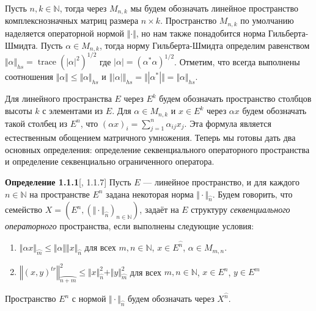 \documentclass[12pt]{article}
\begin{document}
\medskip

Пусть $n, k\in\mathbb{N}$, тогда через $M_{n,k}$ мы будем обозначать линейное
пространство комплекснозначных матриц размера $n\times k$. Пространство
$M_{n,k}$ по умолчанию наделяется операторной нормой $\Vert\cdot\Vert$, но нам
также понадобится норма Гильберта-Шмидта. Пусть $\alpha\in M_{n,k}$, тогда норму
Гильберта-Шмидта определим равенством
$\Vert\alpha\Vert_{hs}=\operatorname{trace}{(|\alpha|^2)}^{1/2}$ где
$|\alpha|={(\alpha^*\alpha)}^{1/2}$. Отметим, что всегда выполнены соотношения
$\Vert\alpha\Vert\leq\Vert\alpha\Vert_{hs}$ и
$\Vert|\alpha|\Vert_{hs}=\Vert|\alpha^*|\Vert=\Vert\alpha\Vert_{hs}$.

\medskip

Для линейного пространства $E$ через $E^k$ будем обозначать пространство
столбцов высоты $k$ с элементами из $E$. Для $\alpha\in M_{n,k}$ и $x\in E^k$
через $\alpha x$ будем обозначать такой столбец из $E^n$, что 
${(\alpha x)}_i=\sum_{j=1}^n \alpha_{ij} x_j$. Эта  формула является естественным обощением
матричного умножения. Теперь мы готовы дать два основных определения:
определение секвенциального операторного пространства и определение
секвенциально ограниченного оператора.

\medskip

{\bf Определение 1.1.1}[\cite{LamOpFolgen}, 1.1.7]\label{DefSQSpace} Пусть $E$
--- линейное пространство, и для каждого $n\in\mathbb{N}$ на пространстве $E^n$
задана некоторая норма $\Vert \cdot \Vert_{\wideparen{n}}$. Будем говорить, что
семейство $X = (E^n, {(\Vert \cdot \Vert_{\wideparen{n}})}_{n \in \mathbb{N}})$,
задаёт на $E$ структуру \textit{секвенциального операторного} пространства, если
выполнены следующие условия:
\begin{enumerate}[label = (\roman*)]
    \item  $\Vert \alpha x \Vert_{\wideparen{m}} 
    \leq \Vert \alpha \Vert  \Vert x
    \Vert_{\wideparen{n}}$ для всех $m, n \in \mathbb{N}$, $x \in
    E^{\wideparen{n}}$, $\alpha \in M_{m, n}$.

    \item $\left\Vert {(x,y)}^{tr} \right\Vert^2_{\wideparen{n + m}} 
    \leq\Vert x\Vert_{\wideparen{n}}^2 + 
    \Vert y \Vert_{\wideparen{m}}^2$ для всех $m, n \in
    \mathbb{N}$, $x \in E^n$, $y \in E^m$ 
\end{enumerate}
Пространство $E^n$ с нормой $\Vert \cdot \Vert_{\wideparen{n}}$ будем обозначать
через $X^{\wideparen{n}}$.

\medskip
\end{document}
